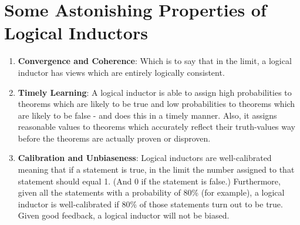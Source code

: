 \documentclass{article}
\begin{document}
\section{Some Astonishing Properties of Logical Inductors}
\begin{enumerate} 
\item \textbf{Convergence and Coherence}: Which is to say that in the limit, a logical inductor has views which are entirely logically consistent. 

\item \textbf{Timely Learning}:
A logical inductor is able to assign high probabilities to theorems which are likely to be true and low probabilities to theorems which are likely to be false - and does this in a timely manner. Also, it assigns reasonable values to theorems which accurately reflect their truth-values way before the theorems are actually proven or disproven.

\item \textbf{Calibration and Unbiaseness}:
Logical inductors are well-calibrated meaning that if a statement is true, in the limit the number assigned to that statement should equal 1.  (And 0 if the statement is false.) Furthermore, given all the statements with a probability of 80\% (for example), a logical inductor is well-calibrated if 80\% of those statements turn out to be true. Given good feedback, a logical inductor will not be biased.


\end{enumerate}
\end{document}
